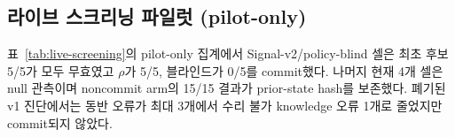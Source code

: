 \subsection{라이브 스크리닝 파일럿 (pilot-only)}
표~\ref{tab:live-screening}의 pilot-only 집계에서 Signal-v2/policy-blind 셀은 최초 후보 5/5가 모두 무효였고 $\rho$가 5/5, 블라인드가 0/5를 commit했다. 나머지 현재 4개 셀은 null 관측이며 noncommit arm의 15/15 결과가 prior-state hash를 보존했다. 폐기된 v1 진단에서는 동반 오류가 최대 3개에서 수리 불가 knowledge 오류 1개로 줄었지만 commit되지 않았다.
